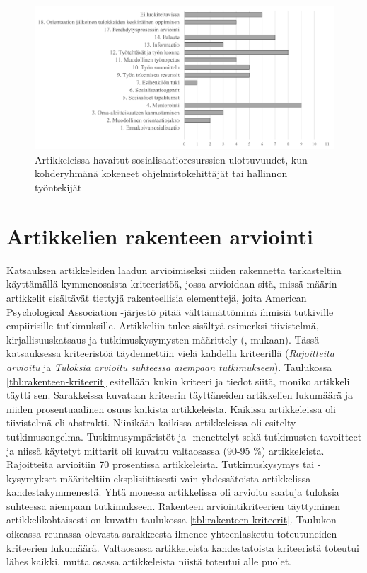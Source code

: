 \documentclass[utf8]{gradu3}
\begin{document}
\begin{figure}[h]
    \centering
    \includegraphics[width=\textwidth]{media/ulottuvuudet_kohderyhmat_kokeneet_tai_hallinto.png}
    \caption{Artikkeleissa havaitut sosialisaatioresurssien ulottuvuudet, kun kohderyhmänä kokeneet ohjelmistokehittäjät tai hallinnon työntekijät}
    \label{kuvio:ulottuvuudet_kohderyhmat_kokeneet_tai_hallinto}
\end{figure}

\section{Artikkelien rakenteen arviointi}
\label{luku-artikkelien-rakenteen-arviointi}

Katsauksen artikkeleiden laadun arvioimiseksi niiden rakennetta tarkasteltiin käyttämällä kymmenosaista kriteeristöä, jossa arvioidaan sitä, missä määrin artikkelit sisältävät tiettyjä rakenteellisia elementtejä, joita American Psychological Association -järjestö pitää välttämättöminä ihmisiä tutkiville empiirisille tutkimuksille. Artikkeliin tulee sisältyä esimerksi tiivistelmä, kirjallisuuskatsaus ja tutkimuskysymysten määrittely (\textcite{apa-2001}, \textcite{randolph-ym-2008} mukaan). Tässä katsauksessa kriteeristöä täydennettiin vielä kahdella kriteerillä (\textit{Rajoitteita arvioitu} ja \textit{Tuloksia arvioitu suhteessa aiempaan tutkimukseen}). Taulukossa \ref{tbl:rakenteen-kriteerit} esitellään kukin kriteeri ja tiedot siitä, moniko artikkeli täytti sen. Sarakkeissa kuvataan kriteerin täyttäneiden artikkelien lukumäärä ja niiden prosentuaalinen osuus kaikista artikkeleista. Kaikissa artikkeleissa oli tiivistelmä eli abstrakti. Niinikään kaikissa artikkeleissa oli esitelty tutkimusongelma. Tutkimusympäristöt ja -menettelyt sekä tutkimusten tavoitteet ja niissä käytetyt mittarit oli kuvattu valtaosassa (90-95 \%) artikkeleista. Rajoitteita arvioitiin 70 prosentissa artikkeleista. Tutkimuskysymys tai -kysymykset määriteltiin eksplisiittisesti vain yhdessätoista artikkelissa kahdestakymmenestä. Yhtä monessa artikkelissa oli arvioitu saatuja tuloksia suhteessa aiempaan tutkimukseen. Rakenteen arviointikriteerien täyttyminen artikkelikohtaisesti on kuvattu taulukossa \ref{tbl:rakenteen-kriteerit}. Taulukon oikeassa reunassa olevasta sarakkeesta ilmenee yhteenlaskettu toteutuneiden kriteerien lukumäärä. Valtaosassa artikkeleista kahdestatoista kriteeristä toteutui lähes kaikki, mutta osassa artikkeleista niistä toteutui alle puolet.
\end{document}
